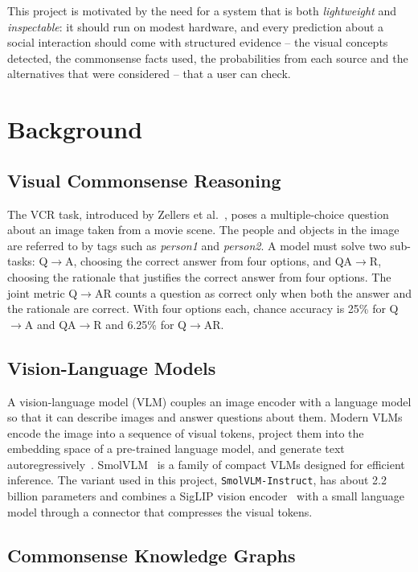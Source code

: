 \documentclass[12pt,a4paper,oneside]{report}
\newcommand{\QtoA}{Q$\rightarrow$A}
\newcommand{\QAtoR}{QA$\rightarrow$R}
\newcommand{\QtoAR}{Q$\rightarrow$AR}
\newcommand{\code}[1]{\texttt{#1}}
\begin{document}
This project is motivated by the need for a system that is both
\emph{lightweight} and \emph{inspectable}: it should run on modest hardware, and
every prediction about a social interaction should come with structured
evidence -- the visual concepts detected, the commonsense facts used, the
probabilities from each source and the alternatives that were considered --
that a user can check.

\section{Background}

\subsection{Visual Commonsense Reasoning}

The VCR task, introduced by Zellers et al.~\cite{zellers2019vcr}, poses a
multiple-choice question about an image taken from a movie scene. The people
and objects in the image are referred to by tags such as \emph{person1} and
\emph{person2}. A model must solve two sub-tasks: \QtoA, choosing the correct
answer from four options, and \QAtoR, choosing the rationale that justifies
the correct answer from four options. The joint metric \QtoAR{} counts a
question as correct only when both the answer and the rationale are correct.
With four options each, chance accuracy is 25\% for \QtoA{} and \QAtoR{} and
6.25\% for \QtoAR.

\subsection{Vision-Language Models}

A vision-language model (VLM) couples an image encoder with a language model so
that it can describe images and answer questions about them. Modern VLMs encode
the image into a sequence of visual tokens, project them into the embedding
space of a pre-trained language model, and generate text
autoregressively~\cite{liu2023llava,li2023blip2}. SmolVLM~\cite{marafioti2025smolvlm}
is a family of compact VLMs designed for efficient inference. The variant used
in this project, \code{SmolVLM-Instruct}, has about 2.2 billion parameters and
combines a SigLIP vision encoder~\cite{zhai2023siglip} with a small
language model through a connector that compresses the visual tokens.

\subsection{Commonsense Knowledge Graphs}
\end{document}
